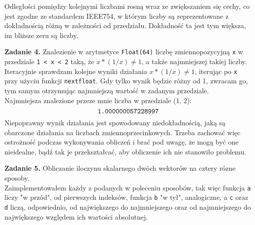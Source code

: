 \documentclass[15pt, a4paper]{article}
\begin{document}
\vspace{0.5cm}

Odległości pomiędzy kolejnymi liczbami rosną wraz ze zwiększaniem się cechy, co jest zgodne ze standardem IEEE754, w którym liczby są reprezentowane z dokładnością różną w zależności od przedziału. Dokładność ta jest tym większa, im bliższe zeru są liczby.

\vspace{0.5cm}

\noindent\hrulefill


\vspace{0.5cm}

\noindent\textbf{Zadanie 4.} Znalezienie w arytmetyce \verb|Float(64)| liczbę zmiennopozycyjną \verb|x| w przedziale \verb|1 < x < 2| taką, że $x * (1/x) \neq 1$, a także najmniejszej takiej liczby.\\
Iteracyjnie sprawdzam kolejne wyniki działania $x * (1/x) \neq 1$, iterując po \verb|x| przy użyciu funkcji \verb|nextfloat|. Gdy tylko wynik będzie różny od 1, zwracam go, tym samym otrzymując najmniejszą wartość w zadanym przedziale.\\
Najmniejsza znalezione przeze mnie liczba w przedziale (1, 2): \[\verb|1.000000057228997|\]
Niepoprawny wynik działania jest spowodowany niedokładnością, jaką są obarczone działania na liczbach zmiennoprzecinkowych. Trzeba zachować więc ostrożność podczas wykonywania obliczeń i brać pod uwagę, że mogą być one nieidealne, bądź tak je przekształcać, aby obliczenie ich nie stanowiło problemu.

\vspace{0.5cm}

\noindent\hrulefill


\vspace{0.5cm}

\noindent\textbf{Zadanie 5.} Obliczanie iloczynu skalarnego dwóch wektorów na cztery rózne sposoby.\\
Zaimplementowałem każdy z podanych w poleceniu sposobów, tak więc funkcja \verb|a| liczy "w przód", od pierwszych indeksów, funkcja \verb|b| "w tył", analogiczne, a \verb|c| oraz \verb|d| liczą, odpowiednio, od największego do najmniejszego oraz od najmniejszego do największego względem ich wartości absolutnej.
\end{document}

